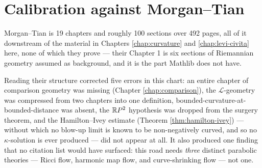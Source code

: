 \section*{Calibration against Morgan--Tian}

Morgan--Tian is 19 chapters and roughly 100 sections over 492 pages, all of it
downstream of the material in Chapters \ref{chap:curvature} and
\ref{chap:levi-civita} here, none of which they prove --- their Chapter 1 is
six sections of Riemannian geometry assumed as background, and it is the part
Mathlib does not have.

Reading their structure corrected five errors in this chart: an entire chapter
of comparison geometry was missing (Chapter \ref{chap:comparison}), the
$\mathcal{L}$-geometry was compressed from two chapters into one definition,
bounded-curvature-at-bounded-distance was absent, the $\mathbb{R} P^2$ hypothesis
was dropped from the surgery theorem, and the Hamilton--Ivey estimate
(Theorem \ref{thm:hamilton-ivey}) --- without which no blow-up limit is known
to be non-negatively curved, and so no $\kappa$-solution is ever produced ---
did not appear at all. It also produced one finding that no
citation list would have surfaced: this road needs \emph{three} distinct
parabolic theories --- Ricci flow, harmonic map flow, and curve-shrinking flow
--- not one.
